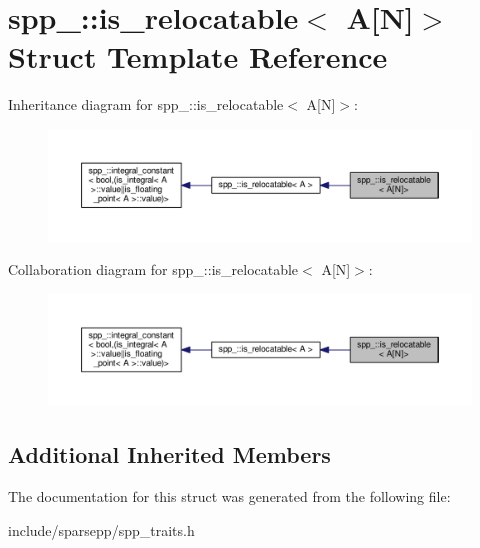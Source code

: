 \hypertarget{structspp___1_1is__relocatable_3_01_a[_n]_4}{}\section{spp\+\_\+\+:\+:is\+\_\+relocatable$<$ A\mbox{[}N\mbox{]}$>$ Struct Template Reference}
\label{structspp___1_1is__relocatable_3_01_a[_n]_4}


Inheritance diagram for spp\+\_\+\+:\+:is\+\_\+relocatable$<$ A\mbox{[}N\mbox{]}$>$\+:\nopagebreak
\begin{figure}[H]
\begin{center}
\leavevmode
\includegraphics[width=350pt]{structspp___1_1is__relocatable_3_01_a[_n]_4__inherit__graph}
\end{center}
\end{figure}


Collaboration diagram for spp\+\_\+\+:\+:is\+\_\+relocatable$<$ A\mbox{[}N\mbox{]}$>$\+:\nopagebreak
\begin{figure}[H]
\begin{center}
\leavevmode
\includegraphics[width=350pt]{structspp___1_1is__relocatable_3_01_a[_n]_4__coll__graph}
\end{center}
\end{figure}
\subsection*{Additional Inherited Members}


The documentation for this struct was generated from the following file\+:\begin{DoxyCompactItemize}
\item 
include/sparsepp/spp\+\_\+traits.\+h\end{DoxyCompactItemize}
